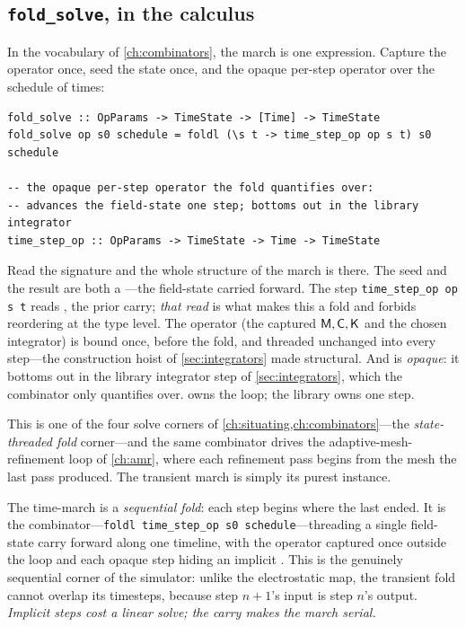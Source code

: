 \subsection{\texttt{fold\_solve}, in the calculus}

In the vocabulary of \cref{ch:combinators}, the march is one expression. Capture
the operator once, seed the state once, and  the opaque per-step
operator over the schedule of times:
\begin{lstlisting}[style=l4style]
fold_solve :: OpParams -> TimeState -> [Time] -> TimeState
fold_solve op s0 schedule = foldl (\s t -> time_step_op op s t) s0 schedule

-- the opaque per-step operator the fold quantifies over:
-- advances the field-state one step; bottoms out in the library integrator
time_step_op :: OpParams -> TimeState -> Time -> TimeState
\end{lstlisting}
Read the signature and the whole structure of the march is there. The seed
 and the result are both a ---the field-state carried
forward. The step \lstinline[style=l4style]|time_step_op op s t| reads ,
the prior carry; \emph{that read} is what makes this a fold and forbids reordering
at the type level. The operator  (the captured $\mathsf{M},\mathsf{C},\mathsf{K}$ and the
chosen integrator) is bound once, before the fold, and threaded unchanged into
every step---the construction hoist of \cref{sec:integrators} made structural.
And  is \emph{opaque}: it bottoms out in the library
integrator step of \cref{sec:integrators}, which the combinator only quantifies
over.  owns the loop; the library owns one step.

This is one of the four solve corners of \cref{ch:situating,ch:combinators}---the
\emph{state-threaded fold} corner---and the same combinator drives the
adaptive-mesh-refinement loop of \cref{ch:amr}, where each refinement pass begins
from the mesh the last pass produced. The transient march is simply its purest
instance.

\begin{keyidea}
The time-march is a \emph{sequential fold}: each step begins where the last ended.
It is the  combinator---\lstinline[style=l4style]|foldl time_step_op s0 schedule|---threading
a single field-state carry forward along one timeline, with the operator captured
once outside the loop and each opaque step hiding an implicit .
This is the genuinely sequential corner of the simulator: unlike the electrostatic
map, the transient fold cannot overlap its timesteps, because step $n+1$'s input is
step $n$'s output. \emph{Implicit steps cost a linear solve; the carry makes the
march serial.}
\end{keyidea}

